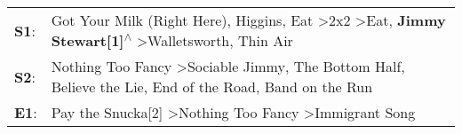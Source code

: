 \begin{supertabular}{p{0.03\textwidth}p{0.92\textwidth}}
 \textbf{S1}:  &  Got Your Milk (Right Here)\textsuperscript{}, \enspace Higgins\textsuperscript{}, \enspace Eat\textsuperscript{} \textgreater \enspace 2x2\textsuperscript{} \textgreater \enspace Eat\textsuperscript{}, \enspace \textbf{Jimmy Stewart[1]\textsuperscript{$\wedge$}} \textgreater \enspace Walletsworth\textsuperscript{}, \enspace Thin Air\textsuperscript{}  \enspace  \\
 \textbf{S2}:  &                                                                                        Nothing Too Fancy\textsuperscript{} \textgreater \enspace Sociable Jimmy\textsuperscript{}, \enspace The Bottom Half\textsuperscript{}, \enspace Believe the Lie\textsuperscript{}, \enspace End of the Road\textsuperscript{}, \enspace Band on the Run\textsuperscript{}  \enspace  \\
 \textbf{E1}:  &                                                                                                                                                                                                              Pay the Snucka[2]\textsuperscript{} \textgreater \enspace Nothing Too Fancy\textsuperscript{} \textgreater \enspace Immigrant Song\textsuperscript{}  \enspace  \\
\end{supertabular}
